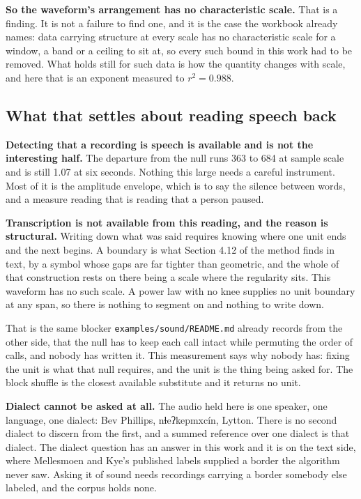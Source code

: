 \textbf{So the waveform's arrangement has no characteristic scale.} That is a finding. It is not a
failure to find one, and it is the case the workbook already names: data carrying structure at every
scale has no characteristic scale for a window, a band or a ceiling to sit at, so every
such bound in this work had to be removed. What holds still for such data is how the quantity changes
with scale, and here that is an exponent measured to \(r^2 = 0.988\).

\subsection{What that settles about reading speech back}

\textbf{Detecting that a recording is speech is available and is not the interesting half.} The
departure from the null runs 363 to 684 at sample scale and is still 1.07 at six seconds. Nothing
this large needs a careful instrument. Most of it is the amplitude envelope, which is to say the
silence between words, and a measure reading that is reading that a person paused.

\textbf{Transcription is not available from this reading, and the reason is structural.} Writing down
what was said requires knowing where one unit ends and the next begins. A boundary is what
Section 4.12 of the method finds in text, by a symbol whose gaps are far tighter than geometric, and
the whole of that construction rests on there being a scale where the regularity sits. This waveform
has no such scale. A power law with no knee supplies no unit boundary at any span, so there is
nothing to segment on and nothing to write down.

That is the same blocker \texttt{examples/\allowbreak{}sound/\allowbreak{}README.\allowbreak{}md}
already records from the other side, that the null has to keep each call intact while
permuting the order of calls, and nobody has written it. This measurement says why nobody has: fixing
the unit is what that null requires, and the unit is the thing being asked for. The block shuffle is
the closest available substitute and it returns no unit.

\textbf{Dialect cannot be asked at all.} The audio held here is one speaker, one language, one
dialect: Bev Phillips, nɬeʔkepmxcín, Lytton. There is no second dialect to discern from the first, and
a summed reference over one dialect is that dialect. The dialect question has an answer in this work
and it is on the text side, where Mellesmoen and Kye's published labels supplied a border the
algorithm never saw. Asking it of sound needs recordings carrying a border somebody else labeled, and
the corpus holds none.

